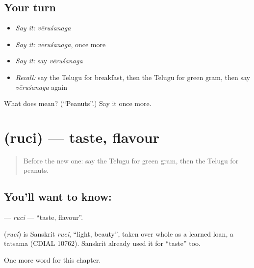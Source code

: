 \subsection*{Your turn}
\begin{itemize}
\raggedright
  \item \emph{Say it:} \emph{vēruśanaga}
  \item \emph{Say it:} \emph{vēruśanaga}, once more
  \item \emph{Say it:} say \emph{vēruśanaga}
  \item \emph{Recall:} say the Telugu for breakfast, then the Telugu for green gram, then say \emph{vēruśanaga} again
\end{itemize}

\begin{tcolorbox}[breakable,colback=teal!4,colframe=teal!35!black,title={Before you move on}]
What does  mean? (\textquotedblleft{}Peanuts\textquotedblright{}.) Say it once more.
\end{tcolorbox}
\section[\texorpdfstring{\te{రుచి} (ruci)}{రుచి (ruci)}]{ (ruci) — taste, flavour}

\label{lesson:TE-C263-ruci}



\begin{quote}
Before the new one: say the Telugu for green gram, then the Telugu for peanuts.
\end{quote}

\subsection*{You'll want to know: }
\textbf{} — \emph{ruci} — \textquotedblleft{}taste, flavour\textquotedblright{}.

\begin{cousinweb}
\textbf{} (\emph{ruci}) is Sanskrit \emph{ruci}, \textquotedblleft{}light, beauty\textquotedblright{}, taken over whole as a learned loan, a tatsama (CDIAL 10762). Sanskrit already used it for \textquotedblleft{}taste\textquotedblright{} too.
\end{cousinweb}

\begin{grammarlens}[title={What you've built}]
One more word for this chapter.
\end{grammarlens}

